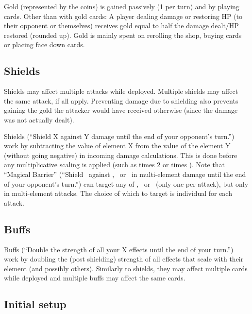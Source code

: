 \documentclass[dvipsnames,parskip,a4paper]{scrartcl}
\newcommand{\iconsize}{3.4mm}
\newcommand{\icondepth}{0.45mm}
\newcommand{\icon}[1]{\raisebox{-\icondepth}{\texttt{[image:  \#1 ]}}}
\newcommand{\fire}{\icon{icons/fire.png}}
\newcommand{\earth}{\icon{icons/earth.png}}
\newcommand{\water}{\icon{icons/water.png}}
\newcommand{\magic}{\icon{icons/magic.png}}
\begin{document}
Gold (represented by the coins) is gained passively (1 per turn) and by playing cards. Other than with gold cards: A player dealing damage or restoring HP (to their opponent or themselves) receives gold equal to half the damage dealt/HP restored (rounded up). Gold is mainly spent on rerolling the shop, buying cards or placing face down cards.

\subsection*{Shields}

Shields may affect multiple attacks while deployed. Multiple shields may affect the same attack, if all apply. Preventing damage due to shielding also prevents gaining the gold the attacker would have received otherwise (since the damage was not actually dealt).

\vspace{4pt}

Shields (``Shield X against Y damage until the end of your opponent's turn.'') work by subtracting the value of element X from the value of the element Y (without going negative) in incoming damage calculations. This is done before any multiplicative scaling is applied (such as times 2 or times \magic). Note that ``Magical Barrier'' (``Shield \magic \ against \fire, \earth \ or \water \ in multi-element damage until the end of your opponent's turn.'') can target any of \fire, \earth \ or \water \ (only one per attack), but only in multi-element attacks. The choice of which to target is individual for each attack.

\subsection*{Buffs}

Buffs (``Double the strength of all your X effects until the end of your turn.'') work by doubling the (post shielding) strength of all effects that scale with their element (and possibly others). Similarly to shields, they may affect multiple cards while deployed and multiple buffs may affect the same cards.

\subsection*{Initial setup}
\end{document}
